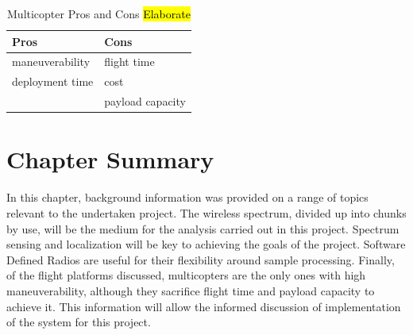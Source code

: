\begin{table}[ht]
\centering
\caption{Multicopter Pros and Cons \hl{Elaborate}}
\label{table:multi_pc}
\begin{tabular}{l|l}
  Pros & Cons \\ \hline
  maneuverability & flight time \\
  deployment time & cost \\
   & payload capacity \\
\end{tabular}
\end{table}\par

\section{Chapter Summary}
In this chapter, background information was provided on a range of topics relevant to the undertaken project. The wireless spectrum, divided up into chunks by use, will be the medium for the analysis carried out in this project. Spectrum sensing and localization will be key to achieving the goals of the project. Software Defined Radios are useful for their flexibility around sample processing. Finally, of the flight platforms discussed, multicopters are the only ones with high maneuverability, although they sacrifice flight time and payload capacity to achieve it. This information will allow the informed discussion of implementation of the system for this project.
